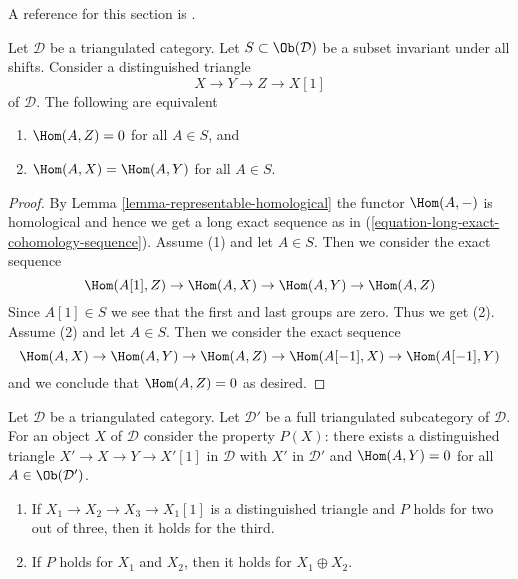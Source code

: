 \noindent
A reference for this section is \cite[Section 1]{Bondal-Kapranov}.

\begin{lemma}
\label{lemma-pre-prepare-adjoint}
Let $\mathcal{D}$ be a triangulated category. Let $S \subset \Ob(\mathcal{D})$
be a subset invariant under all shifts. Consider a distinguished triangle
$$
X \to Y \to Z \to X[1]
$$
of $\mathcal{D}$. The following are equivalent
\begin{enumerate}
\item $\Hom(A, Z) = 0$ for all $A \in S$, and
\item $\Hom(A, X) = \Hom(A, Y)$ for all $A \in S$.
\end{enumerate}
\end{lemma}

\begin{proof}
By Lemma \ref{lemma-representable-homological} the functor
$\Hom(A, -)$ is homological and hence we get a long exact sequence
as in (\ref{equation-long-exact-cohomology-sequence}).
Assume (1) and let $A \in S$. Then we consider the exact sequence
$$
\Hom(A[1], Z) \to \Hom(A, X) \to \Hom(A, Y) \to \Hom(A, Z)
$$
Since $A[1] \in S$ we see that the first and last groups are zero.
Thus we get (2). Assume (2) and let $A \in S$. Then we consider the
exact sequence
$$
\Hom(A, X) \to \Hom(A, Y) \to \Hom(A, Z) \to \Hom(A[-1], X) \to \Hom(A[-1], Y)
$$
and we conclude that $\Hom(A, Z) = 0$ as desired.
\end{proof}

\begin{lemma}
\label{lemma-prepare-adjoint}
Let $\mathcal{D}$ be a triangulated category. Let $\mathcal{D}'$
be a full triangulated subcategory of $\mathcal{D}$. For an object $X$
of $\mathcal{D}$ consider the property $P(X)$: there exists a
distinguished triangle $X' \to X \to Y \to X'[1]$
in $\mathcal{D}$ with $X'$ in $\mathcal{D}'$ and
$\Hom(A, Y) = 0$ for all $A \in \Ob(\mathcal{D}')$.
\begin{enumerate}
\item If $X_1 \to X_2 \to X_3 \to X_1[1]$ is a distinguished triangle
and $P$ holds for two out of three, then it holds for the third.
\item If $P$ holds for $X_1$ and $X_2$, then it holds for $X_1 \oplus X_2$.
\end{enumerate}
\end{lemma}

